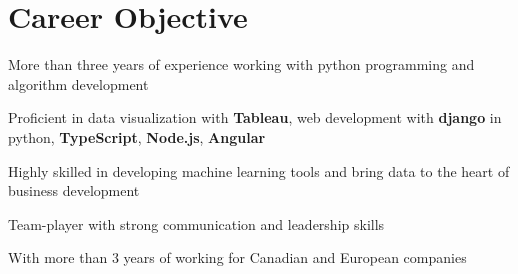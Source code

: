 \documentclass[letter,11pt]{article}
\begin{document}

\section{Career Objective}
\begin{zitemize}
	\item More than three years of experience working with python programming and algorithm development
	\item Proficient in data visualization with \textbf{Tableau}, web development with \textbf{django} in python, \textbf{TypeScript}, \textbf{Node.js}, \textbf{Angular}
	\item Highly skilled in developing machine learning tools and bring data to the heart of business development
	\item Team-player with strong communication and leadership skills
	\item With more than 3 years of working for Canadian and European companies
\end{zitemize}
\end{document}
